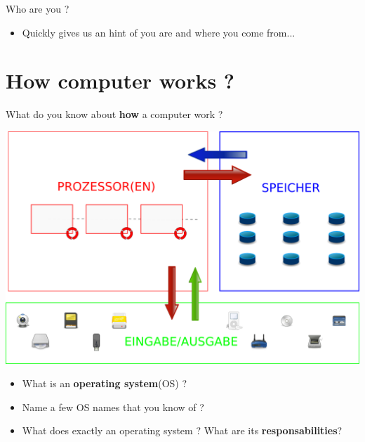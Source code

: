 {\begin{frame}
    \begin{block}{Who are you ?}
      \begin{itemize}
        \item Quickly gives us an hint of you are and where you come from...
      \end{itemize}
    \end{block}
  \end{frame}

  \section{How computer works ?}

  \begin{frame}
    \begin{center}
        What do you know about \textbf{how} a computer work ?
    \end{center}
  \end{frame}

  \begin{frame}
   \begin{center}
     \includegraphics[scale=0.3]{img/cpu-schematics.png}
   \end{center}
  \end{frame}

  \begin{frame}
    \begin{center}
      \begin{itemize}
        \item What is an \textbf{operating system}(OS) ?
        \item Name a few OS names that you know of ?
        \item What does exactly an operating system ? What are its \textbf{responsabilities}?
      \end{itemize}
    \end{center}
  \end{frame}

}

